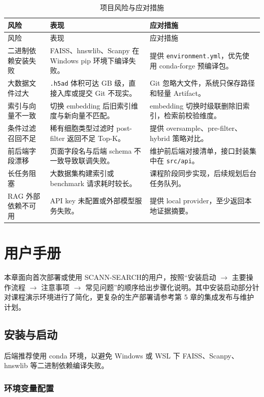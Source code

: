 \documentclass[UTF8,a4paper,12pt]{ctexrep}
\newcommand{\project}{SCANN-SEARCH}
\begin{document}
\begin{longtable}{L{0.20\textwidth}L{0.34\textwidth}L{0.34\textwidth}}
  \caption{项目风险与应对措施} \\
  \toprule
  风险 & 表现 & 应对措施 \\
  \midrule
  \endfirsthead
  \toprule
  风险 & 表现 & 应对措施 \\
  \midrule
  \endhead
  二进制依赖安装失败 & FAISS、hnswlib、Scanpy 在 Windows pip 环境下编译失败。 & 提供 \texttt{environment.yml}，优先使用 conda-forge 预编译包。 \\
  大数据文件过大 & \texttt{.h5ad} 体积可达 GB 级，直接入库或提交 Git 不现实。 & Git 忽略大文件，系统只保存路径和轻量 Artifact。 \\
  索引与向量不一致 & 切换 embedding 后旧索引维度与新向量不匹配。 & embedding 切换时级联删除旧索引，检索前校验维度。 \\
  条件过滤召回不足 & 稀有细胞类型过滤时 post-filter 返回不足 Top-K。 & 提供 oversample、pre-filter、hybrid 策略对比。 \\
  前后端字段漂移 & 页面字段名与后端 schema 不一致导致联调失败。 & 维护前后端对接清单，接口封装集中在 \texttt{src/api}。 \\
  长任务阻塞 & 大数据集构建索引或 benchmark 请求耗时较长。 & 课程阶段同步实现，后续规划后台任务队列。 \\
  RAG 外部依赖不可用 & API key 未配置或外部模型服务失败。 & 提供 local provider，至少返回本地证据摘要。 \\
  \bottomrule
\end{longtable}

\chapter{用户手册}

本章面向首次部署或使用 \project 的用户，按照``安装启动 $\to$ 主要操作流程 $\to$ 注意事项 $\to$ 常见问题''的顺序给出步骤化说明。其中安装启动部分针对课程演示环境进行了简化，更复杂的生产部署请参考第 5 章的集成发布与维护计划。

\section{安装与启动}

后端推荐使用 conda 环境，以避免 Windows 或 WSL 下 FAISS、Scanpy、hnswlib 等二进制依赖编译失败。

\subsection{环境变量配置}
\end{document}
